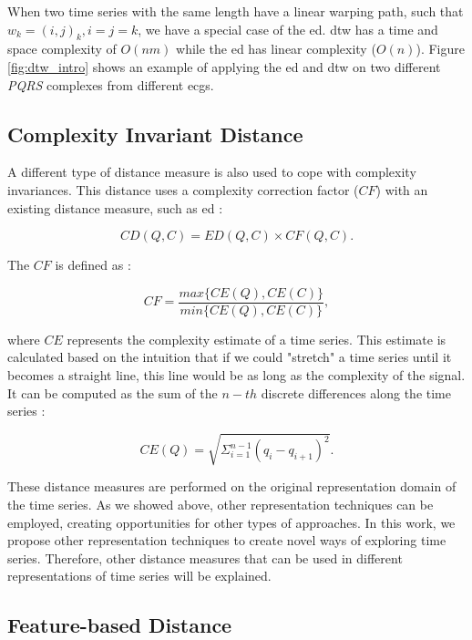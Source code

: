 When two time series with the same length have a linear warping path, such that $w_k=(i,j)_k, i=j=k$, we have a special case of the \gls{ed}. \gls{dtw} has a time and space complexity of $O(nm)$ while the \gls{ed} has linear complexity ($O(n)$). Figure \ref{fig:dtw_intro} shows an example of applying the \gls{ed} and \gls{dtw} on two different \textit{PQRS} complexes from different \gls{ecg}s. 

\subsection{Complexity Invariant Distance}
\label{subsec:complexity}

A different type of distance measure is also used to cope with complexity invariances. This distance uses a complexity correction factor ($CF$) with an existing distance measure, such as \gls{ed} \cite{complexity}:

\begin{equation}
CD(Q,C) = ED(Q,C)\times CF(Q,C).
\end{equation}

The $CF$ is defined as \cite{complexity}:

\begin{equation}
CF = \frac{max\{CE(Q),CE(C)\}}{min\{CE(Q),CE(C)\}},
\end{equation}

where $CE$ represents the complexity estimate of a time series. This estimate is calculated based on the intuition that if we could  "stretch" a time series until it becomes a straight line, this line would be as long as the complexity of the signal. It can be computed as the sum of the $n-th$ discrete differences along the time series \cite{complexity}:

\begin{equation}
\label{eq:complexity}
CE(Q) = \sqrt{\Sigma^{n-1}_{i=1} (q_i - q_{i+1})^2}.
\end{equation}

These distance measures are performed on the original representation domain of the time series. As we showed above, other representation techniques can be employed, creating opportunities for other types of approaches. In this work, we propose other representation techniques to create novel ways of exploring time series. Therefore, other distance measures that can be used in different representations of time series will be explained. 

\subsection{Feature-based Distance}
\label{subsec:features_dist}

